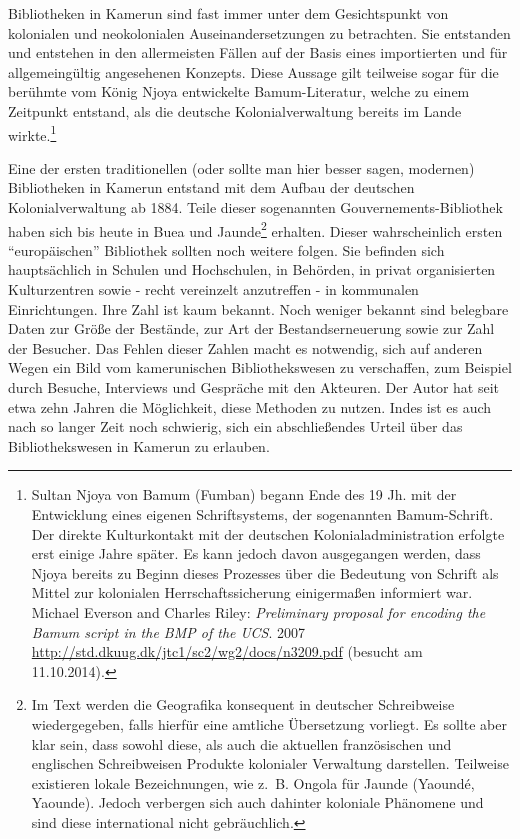 \documentclass[a4paper,
fontsize=11pt,
oneside,
numbers=noperiodatend,
parskip=half-,
bibliography=totoc,
final
]{scrartcl}
\begin{document}
Bibliotheken in Kamerun sind fast immer unter dem Gesichtspunkt von
kolonialen und neokolonialen Auseinandersetzungen zu betrachten. Sie
entstanden und entstehen in den allermeisten Fällen auf der Basis eines
importierten und für allgemeingültig angesehenen Konzepts. Diese Aussage
gilt teilweise sogar für die berühmte vom König Njoya entwickelte
Bamum-Literatur, welche zu einem Zeitpunkt entstand, als die deutsche
Kolonialverwaltung bereits im Lande wirkte.\footnote{Sultan Njoya von
  Bamum (Fumban) begann Ende des 19 Jh. mit der Entwicklung eines
  eigenen Schriftsystems, der sogenannten Bamum-Schrift. Der direkte
  Kulturkontakt mit der deutschen Kolonialadministration erfolgte erst
  einige Jahre später. Es kann jedoch davon ausgegangen werden, dass
  Njoya bereits zu Beginn dieses Prozesses über die Bedeutung von
  Schrift als Mittel zur kolonialen Herrschaftssicherung einigermaßen
  informiert war. Michael Everson and Charles Riley: \emph{Preliminary
  proposal for encoding the Bamum script in the BMP of the UCS}. 2007
  \url{http://std.dkuug.dk/jtc1/sc2/wg2/docs/n3209.pdf} (besucht am
  11.10.2014).}

Eine der ersten traditionellen (oder sollte man hier besser sagen,
modernen) Bibliotheken in Kamerun entstand mit dem Aufbau der deutschen
Kolonialverwaltung ab 1884. Teile dieser sogenannten
Gouvernements-Bibliothek haben sich bis heute in Buea und
Jaunde\footnote{Im Text werden die Geografika konsequent in deutscher
  Schreibweise wiedergegeben, falls hierfür eine amtliche Übersetzung
  vorliegt. Es sollte aber klar sein, dass sowohl diese, als auch die
  aktuellen französischen und englischen Schreibweisen Produkte
  kolonialer Verwaltung darstellen. Teilweise existieren lokale
  Bezeichnungen, wie z.~B. Ongola für Jaunde (Yaoundé, Yaounde). Jedoch
  verbergen sich auch dahinter koloniale Phänomene und sind diese
  international nicht gebräuchlich.} erhalten. Dieser wahrscheinlich
ersten \enquote{europäischen} Bibliothek sollten noch weitere folgen.
Sie befinden sich hauptsächlich in Schulen und Hochschulen, in Behörden,
in privat organisierten Kulturzentren sowie - recht vereinzelt
anzutreffen - in kommunalen Einrichtungen. Ihre Zahl ist kaum bekannt.
Noch weniger bekannt sind belegbare Daten zur Größe der Bestände, zur
Art der Bestandserneuerung sowie zur Zahl der Besucher. Das Fehlen
dieser Zahlen macht es notwendig, sich auf anderen Wegen ein Bild vom
kamerunischen Bibliothekswesen zu verschaffen, zum Beispiel durch
Besuche, Interviews und Gespräche mit den Akteuren. Der Autor hat seit
etwa zehn Jahren die Möglichkeit, diese Methoden zu nutzen. Indes ist es
auch nach so langer Zeit noch schwierig, sich ein abschließendes Urteil
über das Bibliothekswesen in Kamerun zu erlauben.
\end{document}
